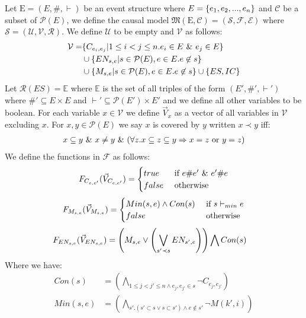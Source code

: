 Let $\mathrm{E} = (E,\#,\vdash)$ be an event structure where
$E = \{e_1, e_2, ...,e_n\}$ and $\mathcal{C}$ be a subset of
$\mathcal{P}(E)$, we define the causal model
$\mathfrak{M}(\mathrm{E},\mathcal{C}) = (\mathcal{S},\mathscr{F},\mathcal{E})$
where
$\mathcal{S} = (\mathcal{U},\mathcal{V},\mathcal{R})$.
We define $\mathcal{U}$ to be empty and $\mathcal{V}$ as follows:
\begin{align*}
    \mathcal{V} = & \{C_{e_i,e_j} |  1 \leq i < j \leq n.
    e_i \in E \ \& \  e_j \in E\}                                \\
                  & \cup \{EN_{s,e} | s \in \mathcal{P}(E),
    e \in E. e \not \in s \}                                  \\
                  & \cup \{M_{s,e} | s \in \mathcal{P}(E),
        e \in E. e \not \in s \} \cup \{ES,IC\}
\end{align*}
Let $\mathcal{R}(ES) = \mathbb{E}$ where $\mathbb{E}$ is the set of all
triples of the form $(E',\#',\vdash')$ where $\#' \subseteq E \times E$
and $\vdash' \subseteq \mathcal{P}(E') \times E'$ and we define all other
variables to be boolean.
For each variable $x \in \mathcal{V}$ we define $\vec V_x$ as a vector
of all variables in $\mathcal{V}$ excluding $x$.
For $x,y \in \mathcal{P}(E)$ we say $x$ is covered by $y$ written $ x \prec y$ iff:
\begin{align*}
    x \subseteq y \ \& \  x \neq y \ \& \ 
    (\forall z. x \subseteq z \subseteq y \Rightarrow x = z
    \text{ or } y = z)
\end{align*}
We define the functions in $\mathscr{F}$ as follows:
$$
    F_{C_{e,e'}}(\vec V_{C_{e,e'}}) = \begin{cases}
        true  & \text{ if } e \# e' \ \& \  e' \# e \\
        false & \text{ otherwise }
    \end{cases}
$$
$$
    F_{M_{s,e}}(\vec V_{M_{s,e}}) = \begin{cases}
        Min(s,e) \wedge Con(s) & \text{ if } s \vdash_{min} e \\
        false                  & \text{ otherwise }
    \end{cases}
$$
\begin{align*}
    F_{EN_{s,e}}(\vec V_{EN_{s,e}}) & =
    \left(
    M_{s,e} \vee
    \left(
    \bigvee_{s'\prec s}EN_{s',e}
    \right)
    \right)
    \bigwedge
    Con(s)
\end{align*}
Where we have:
\begin{align*}
    Con(s)   & =   \left(
    \bigwedge_{ 1\leq j<j' \leq n \wedge e_j,e_{j'} \in s}
    \neg C_{e_j,e_{j'}}
    \right)               \\
    Min(s,e) & = \left(
    \bigwedge_{s'. (s' \subset s \vee s \subset s')
        \wedge e \notin s'}
    \neg M(k',i)
    \right)
\end{align*}

